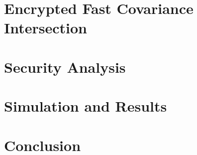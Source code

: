 \documentclass[letterpaper, 10 pt, conference]{ieeeconf}
\begin{document}
\section{Encrypted Fast Covariance Intersection}\label{sec:encrypted_fci}


% 
%                                 
%                                 
%                                 
% 
\section{Security Analysis}\label{sec:security}


% 
%                                 
%                                 
%                                 
% 
\section{Simulation and Results}\label{sec:simulation}


% 
%                                               
%                                               
%                                               
% 
\section{Conclusion}\label{sec:conclusion}



\end{document}
